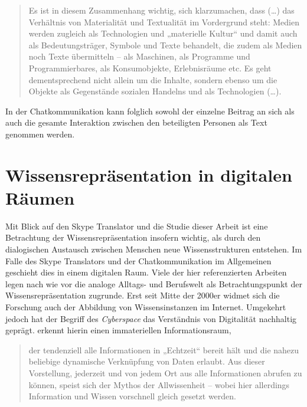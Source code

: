 \begin{quote}
Es ist in diesem Zusammenhang wichtig, sich klarzumachen, dass (\dots) das Verhältnis von Materialität und Textualität im Vordergrund steht: Medien werden zugleich als Technologien und „materielle Kultur“ und damit auch als Bedeutungsträger, Symbole und Texte behandelt, die zudem als Medien noch Texte übermitteln – als Maschinen, als Programme und Programmierbares, als Konsumobjekte, Erlebnisräume etc. Es geht dementsprechend nicht allein um die Inhalte, sondern ebenso um die Objekte als Gegenstände sozialen Handelns und als Technologien (\dots). \citep[261]{schweiger_onlinekommunikation_2019}
\end{quote}

In der Chatkommunikation kann folglich sowohl der einzelne Beitrag an sich als auch die gesamte Interaktion zwischen den beteiligten Personen als Text genommen werden. 




\section{Wissensrepräsentation in digitalen Räumen}
\label{K2:sec:Wissensrepräsentation}


Mit Blick auf den Skype Translator und die Studie dieser Arbeit ist eine Betrachtung der Wissensrepräsentation insofern wichtig, als durch den dialogischen Austausch zwischen Menschen neue Wissensstrukturen entstehen. Im Falle des Skype Translators und der Chatkommunikation im Allgemeinen geschieht dies in einem digitalen Raum. Viele der hier referenzierten Arbeiten legen nach wie vor die analoge Alltags- und Berufswelt als Betrachtungspunkt der Wissensrepräsentation zugrunde. Erst seit Mitte der 2000er widmet sich die Forschung auch der Abbildung von Wissensinstanzen im Internet. Umgekehrt jedoch hat der Begriff des \emph{Cyberspace} das Verständnis von Digitalität nachhaltig geprägt. \citeauthor{beck_computervermittelte_2006} erkennt hierin einen immateriellen Informationsraum,\largerpage

\begin{quote}
    der tendenziell alle Informationen in „Echtzeit“ bereit hält und die nahezu beliebige dynamische Verknüpfung von Daten erlaubt. Aus dieser Vorstellung, jederzeit und von jedem Ort aus alle Informationen abrufen zu können, speist sich der Mythos der Allwissenheit – wobei hier allerdings Information und Wissen vorschnell gleich gesetzt werden. \citep[2]{beck_computervermittelte_2006}
\end{quote}

